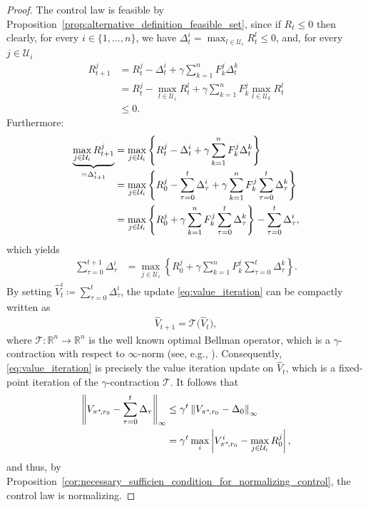 \documentclass[10pt,leqno]{amsart}
\newcommand{\norm}[1]{\left \|#1 \right \|}
\newcommand{\R}{\mathbb{R}}
\newcommand{\U}{\mathcal{U}}
\newcommand{\cost}{r}
\newcommand{\Vsym}{V}
\newcommand{\Varg}[1]{\Vsym_{#1}}
\newcommand{\Cost}{R}
\newcommand{\F}{F}
\newcommand{\policy}{\pi}
\newcommand{\disc}{\gamma}
\newcommand{\infnorm}[1]{\norm{#1}_\infty}
\newcommand{\bellman}{\mathcal{T}}
\begin{document}
\begin{proof}
    The control law is feasible by Proposition~\ref{prop:alternative_definition_feasible_set}, since if $\Cost_t \leq 0$ then clearly, for every $i \in \{1, \hdots, n\}$, we have $\Delta_t^i = \max_{l \in \U_i} \Cost^l_t \leq 0$, and, for every $j \in \U_i$
    \begin{align}
        \Cost^j_{t + 1} &= \Cost_t^j - \Delta^i_t + \disc \sum_{k = 1}^n \F_k^j \Delta_t^k\\
        &= \Cost_t^j - \max_{l \in \U_i} \Cost^l_t + \disc \sum_{k = 1}^n \F_k^j \max_{l \in \U_k} \Cost_t^l\\
        &\leq 0.
    \end{align}
    Furthermore:
    \begin{align*}
        \smash{\underbrace{\max_{j \in \U_i} \Cost^j_{t + 1}}_{= \Delta_{t + 1}^i}} &= \max_{j \in \U_i} \left\{\Cost^j_t - \Delta^i_t + \disc \sum_{k = 1}^n \F_k^j \Delta_t^k\right\} \\
        &= \max_{j \in \U_i} \left\{\Cost_0^j - \sum_{\tau = 0}^t \Delta_\tau^i + \disc \sum_{k = 1}^n \F_k^j \sum_{\tau = 0}^t \Delta_\tau^k\right\}\\
        &= \max_{j \in \U_i} \left\{\Cost_0^j + \disc \sum_{k = 1}^n \F_k^j \sum_{\tau = 0}^t \Delta_\tau^k\right\} - \sum_{\tau = 0}^t \Delta_\tau^i,
    \end{align*}
    which yields
    \begin{align}\label{eq:value_iteration}
        \sum_{\tau = 0}^{t+1} \Delta_\tau^i &= \max_{j \in \U_i} \left\{\Cost_0^j + \disc \sum_{k = 1}^n \F_k^j \sum_{\tau = 0}^t \Delta_\tau^k\right\}.
    \end{align}
    By setting $\hat{V}_t^i \coloneqq \sum_{\tau = 0}^{t} \Delta_\tau^i$, the update \eqref{eq:value_iteration} can be compactly written as
    \begin{align}
        \hat{V}_{t+1} = \bellman\bigl(\hat{V}_t\bigr),
    \end{align}
    where $\bellman : \R^n \to \R^n$ is the well known optimal Bellman operator, which is a $\disc$-contraction with respect to $\infty$-norm (see, e.g., \cite[Proposition 6.2.4]{puterman2014markov}). Consequently, \eqref{eq:value_iteration} is precisely the value iteration update on $\hat{V}_t$, which is a fixed-point iteration of the $\disc$-contraction $\bellman$. It follows that
    \begin{align}\label{eq:geometric_bound_on_output_feedback}
        \infnorm{\Varg{\policy^*\!, \cost_0} - \sum_{\tau = 0}^t \Delta_\tau} &\leq \disc^t \infnorm{\Varg{\policy^*\!, \cost_0} - \Delta_0}\notag\\
        &= \disc^t \max_{i} \left| \Varg{\policy^*\!, \cost_0}^i - \max_{j \in \U_i} \Cost_0^j\right|,
    \end{align}
    and thus, by Proposition~\ref{cor:necessary_sufficien_condition_for_normalizing_control}, the control law is normalizing.
\end{proof}
\end{document}
